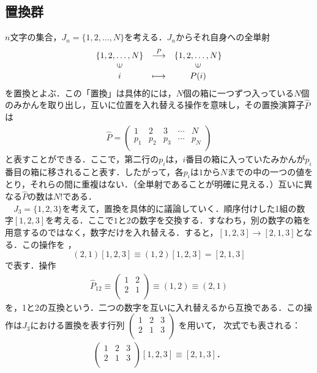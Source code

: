 \documentclass[12pt]{jsarticle}\usepackage{ifthen}\newboolean{enlarge}\setboolean{enlarge}{false}
\newcommand{\be}{\begin{equation}}
\newcommand{\ee}{\end{equation}}
\newcommand{\hP}{{\hat{P}}}
\begin{document}
\subsection{置換群}
$n$文字の集合，$J_n=\{1,2,\ldots,N\}$を考える．$J_n$からそれ自身への全単射
\be
\begin{array}{ccc}
\{1,2,\ldots,N\}& \stackrel{P}{\longrightarrow} & \{1,2,\ldots,N\} \\
\rotatebox{90}{$\in$} & & \rotatebox{90}{$\in$} \\
i & \longmapsto & P(i)
\end{array}
\ee
を置換とよぶ．この「置換」は具体的には，$N$個の箱に一つずつ入っている$N$個のみかんを取り出し，互いに位置を入れ替える操作を意味し，その置換演算子$\hP$は
\begin{align}\label{p1}
\hat{P}=
\left( 
\begin{array}{ccccc} 
1 & 2& 3& \cdots&N\\[5pt] 
p_1 & p_2&p_3& \cdots&p_{N}\\ 
\end{array} 
\right)
  \end{align}
と表すことができる．ここで，第二行の$p_i$は，$i$番目の箱に入っていたみかんが$p_i$番目の箱に移されること表す．したがって，各$p_i$は$1$から$N$までの中の一つの値をとり，それらの間に重複はない．（全単射であることが明確に見える．）互いに異なる$\hP$の数は$N!$である．\\
　$J_3=\{1,2,3\}$を考えて，置換を具体的に議論していく．順序付けした1組の数字$[1,2,3]$を考える．ここで$1$と$2$の数字を交換する．すなわち，別の数字の箱を用意するのではなく，数字だけを入れ替える．すると，$[1,2,3]\to[2,1,3]$となる．この操作を
，
\be
(2,1)[1,2,3]\equiv(1,2)[1,2,3]=[2,1,3]
\ee
で表す．操作
\begin{align}%
\hat{P}_{12}\equiv
\left( 
\begin{array}{cc} 
1 & 2\\[5pt] 
2&1\\ 
\end{array} 
\right)
\equiv(1,2)\equiv(2,1)
  \end{align}
を，1と2の互換という．二つの数字を互いに入れ替えるから互換である．この操作は$J_3$における置換を表す行列
$
\left( 
\begin{array}{ccc} 
1 & 2&3\\ 
2&1&3\\ 
\end{array} 
\right)
$
を用いて，
次式でも表される：
\begin{align}%
\left( 
\begin{array}{ccc} 
1 & 2&3\\[5pt] 
2&1&3\\ 
\end{array} 
\right)
[1,2,3]\equiv[2,1,3]．
  \end{align}
\end{document}
